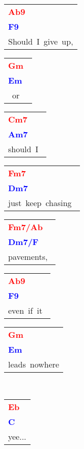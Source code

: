 \documentclass[12pt,a4paper,openany,UTF8]{memoir}
\begin{document}
\begin{tabular}[b]{l}
    \textbf{\textcolor{red}{Ab9\ }}\\\textbf{\textcolor{blue}{F9\ }}\\
    Should~I~give~up,\mbox{}\end{tabular}\begin{tabular}[b]{l}
    \textbf{\textcolor{red}{Gm\ }}\\\textbf{\textcolor{blue}{Em\ }}\\
    ~or~\mbox{}\end{tabular}\begin{tabular}[b]{l}
    \textbf{\textcolor{red}{Cm7\ }}\\\textbf{\textcolor{blue}{Am7\ }}\\
    should~I~\mbox{}\end{tabular}\begin{tabular}[b]{l}
    \textbf{\textcolor{red}{Fm7\ }}\\\textbf{\textcolor{blue}{Dm7\ }}\\
    just~keep~chasing~\mbox{}\end{tabular}\begin{tabular}[b]{l}
    \textbf{\textcolor{red}{Fm7/Ab\ }}\\\textbf{\textcolor{blue}{Dm7/F\ }}\\
    pavements,~\mbox{}\end{tabular}\begin{tabular}[b]{l}
    \textbf{\textcolor{red}{Ab9\ }}\\\textbf{\textcolor{blue}{F9\ }}\\
    even~if~it~\mbox{}\end{tabular}\begin{tabular}[b]{l}
    \textbf{\textcolor{red}{Gm\ }}\\\textbf{\textcolor{blue}{Em\ }}\\
    leads~nowhere\mbox{}\end{tabular}\\
\begin{tabular}[b]{l}
    \textbf{\textcolor{red}{Eb\ }}\\\textbf{\textcolor{blue}{C\ }}\\
    yee...\mbox{}\end{tabular}

    \vspace{\parskip}
\end{document}
